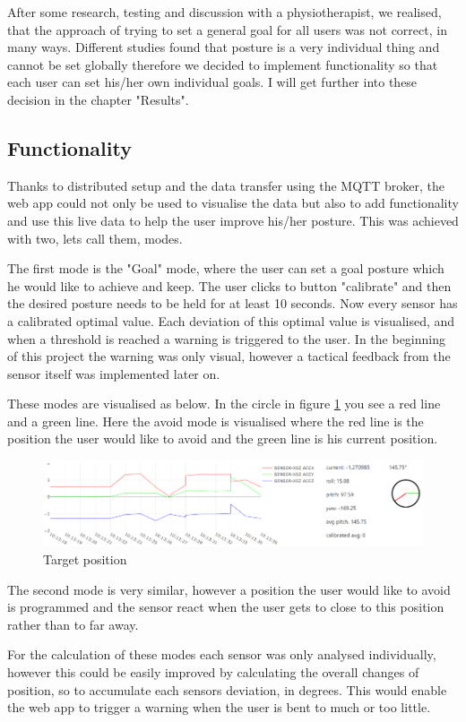After some research, testing and discussion with a physiotherapist, we realised, that the approach of trying to set a general goal for all users was not correct, in many ways. Different studies found that posture is a very individual thing and cannot be set globally \cite{SitUpSt77:online} therefore we decided to implement functionality so that each user can set his/her own individual goals. I will get further into these decision in the chapter "Results".

\subsection{Functionality}

Thanks to distributed setup and the data transfer using the MQTT broker, the web app could not only be used to visualise the data but also to add functionality and use this live data to help the user improve his/her posture. This was achieved with two, lets call them, modes. 

The first mode is the "Goal" mode, where the user can set a goal posture which he would like to achieve and keep. The user clicks to button "calibrate" and then the desired posture needs to be held for at least 10 seconds. 
Now every sensor has a calibrated optimal value. Each deviation of this optimal value is visualised, and when a threshold is reached a warning is triggered to the user. In the beginning of this project the warning was only visual, however a tactical feedback from the sensor itself was implemented later on.

These modes are visualised as below. In the circle in figure \ref{fig:TargetPosition} you see a red line and a green line. Here the avoid mode is visualised where the red line is the position the user would like to avoid and the green line is his current position.

\begin{figure}[ht]
  \begin{center}
\includegraphics[width=\textwidth]{images/WebAppCircle.png}
  \end{center}
  \caption{Target position}
  \label{fig:TargetPosition}
\end{figure}

The second mode is very similar, however a position the user would like to avoid is programmed and the sensor react when the user gets to close to this position rather than to far away. 

For the calculation of these modes each sensor was only analysed individually, however this could be easily improved by calculating the overall changes of position, so to accumulate each sensors deviation, in degrees. This would enable the web app to trigger a warning when the user is bent to much or too little.